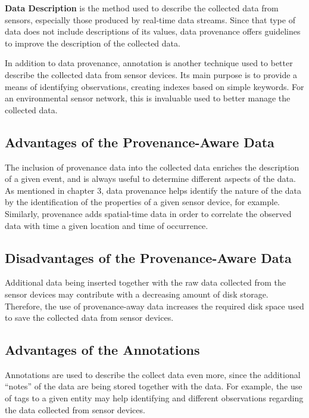 \textbf{Data Description} is the method used to describe the collected data
from sensors, especially those produced by real-time data streams. Since that
type of data does not include descriptions of its values, data provenance
offers guidelines to improve the description of the collected data.

In addition to data provenance, annotation is another technique used to
better describe the collected data from sensor devices. Its main purpose is to
provide a means of identifying observations, creating indexes based on simple
keywords. For an environmental sensor network, this is invaluable used to
better manage the collected data.

\subsection{Advantages of the Provenance-Aware Data}

The inclusion of provenance data into the collected data enriches the
description of a given event, and is always useful to determine different
aspects of the data. As mentioned in chapter 3, data provenance helps identify
the nature of the data by the identification of the properties of a given
sensor device, for example. Similarly, provenance adds spatial-time data in
order to correlate the observed data with time a given location and time of
occurrence.

\subsection{Disadvantages of the Provenance-Aware Data}

Additional data being inserted together with the raw data collected from the
sensor devices may contribute with a decreasing amount of disk storage. 
Therefore, the use of provenance-away data increases the required disk space
used to save the collected data from sensor devices.

\subsection{Advantages of the Annotations}

Annotations are used to describe the collect data even more, since the
additional ``notes'' of the data are being stored together with the data. For
example, the use of tags to a given entity may help identifying and different
observations regarding the data collected from sensor devices.

